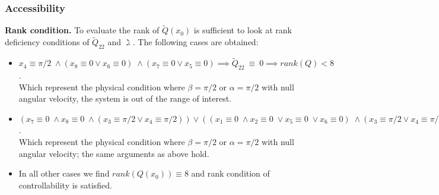 \begin{frame}
\frametitle{Accessibility}
\textbf{Rank condition.} To evaluate the rank of $\tilde{Q}(x_0)$ is sufficient to look at rank deficiency conditions of $\tilde{Q}_{22}$ and $\gimel$. The following cases are obtained:
\begin{itemize}
	\item $x_4 \equiv \pi/2\; \land (x_8 \equiv 0 \lor x_6 \equiv 0)\; \land (x_7 \equiv 0 \lor x_5 \equiv 0) \implies \tilde{Q}_{22}~\equiv~0 \implies rank(Q)<8$.\\ Which represent the physical condition where $\beta = \pi/2$ or $\alpha = \pi/2$  with null angular velocity, the system is out of the range of interest.
	\item $\left(x_7 \equiv 0\; \land x_8 \equiv 0\;\land (x_3 \equiv \pi/2 \lor x_4 \equiv \pi/2)\right) \lor \left((x_1 \equiv 0\; \land x_2 \equiv 0\; \lor x_5 \equiv 0\; \lor x_6 \equiv 0)\;\land (x_3 \equiv \pi/2 \lor x_4 \equiv \pi/2)\right) \implies rank(\gimel)~<~3 \implies rank(Q)<8$.\\ Which represent the physical condition where $\beta = \pi/2$ or $\alpha = \pi/2$ with null angular velocity; the same arguments as above hold.
	\item In all other cases we find $rank(Q(x_0))\equiv8$ and rank condition of controllability is satisfied.
\end{itemize}
\end{frame}
%
